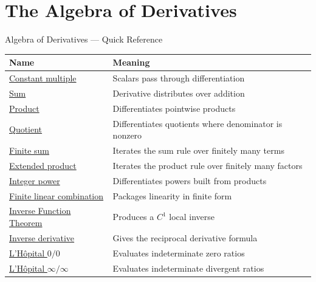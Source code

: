 \section{The Algebra of Derivatives}

\begin{toolkitbox}{Algebra of Derivatives --- Quick Reference}
\small
\begin{tabular}{l l}
\toprule
\textbf{Name} & \textbf{Meaning} \\
\midrule
\hyperref[thm:constant-multiple-rule]{Constant multiple} & Scalars pass through differentiation \\
\hyperref[thm:sum-rule]{Sum} & Derivative distributes over addition \\
\hyperref[thm:product-rule]{Product} & Differentiates pointwise products \\
\hyperref[thm:quotient-rule]{Quotient} & Differentiates quotients where denominator is nonzero \\
\hyperref[cor:finite-sum-rule]{Finite sum} & Iterates the sum rule over finitely many terms \\
\hyperref[cor:extended-product-rule]{Extended product} & Iterates the product rule over finitely many factors \\
\hyperref[cor:power-rule-special-case]{Integer power} & Differentiates powers built from products \\
\hyperref[thm:finite-linear-combination-rule]{Finite linear combination} & Packages linearity in finite form \\
\hyperref[thm:inverse-function-theorem-one-variable]{Inverse Function Theorem} & Produces a \(C^1\) local inverse \\
\hyperref[cor:inverse-function-derivative]{Inverse derivative} & Gives the reciprocal derivative formula \\
\hyperref[thm:lhopital-zero-over-zero]{L'H\^{o}pital \(0/0\)} & Evaluates indeterminate zero ratios \\
\hyperref[thm:lhopital-infinity-over-infinity]{L'H\^{o}pital \(\infty/\infty\)} & Evaluates indeterminate divergent ratios \\
\bottomrule
\end{tabular}
\end{toolkitbox}





